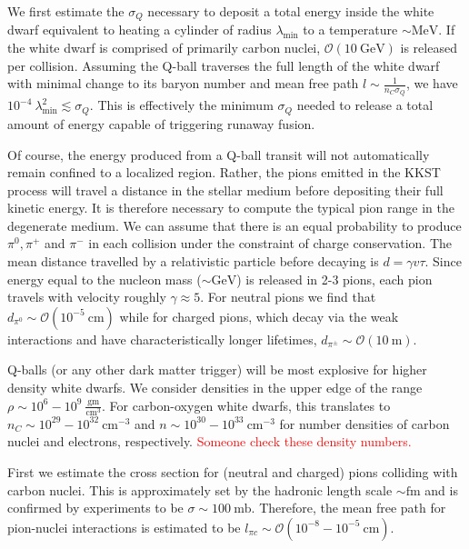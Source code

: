 \documentclass[11 pt, preprint,preprintnumbers,amsmath,amssymb, prd]{revtex4}
\begin{document}
We first estimate the $\sigma_Q$ necessary to deposit a total energy inside the white dwarf equivalent to heating a cylinder of radius $\lambda_{\text{min}}$ to a temperature $\sim \text{MeV}$. If the white dwarf is comprised of primarily carbon nuclei, $\mathcal{O}(10 ~\text{GeV})$ is released per collision. Assuming the Q-ball traverses the full length of the white dwarf with minimal change to its baryon number and mean free path $l \sim \frac{1}{n_C \sigma_Q}$, we have $10^{-4} ~\lambda_{\text{min}}^2 \lesssim \sigma_Q$. This is effectively the minimum $\sigma_Q$ needed to release a total amount of energy capable of triggering runaway fusion. 

Of course, the energy produced from a Q-ball transit will not automatically remain confined to a localized region. Rather, the pions emitted in the KKST process will travel a distance in the stellar medium before depositing their full kinetic energy. It is therefore necessary to compute the typical pion range in the degenerate medium. We can assume that there is an equal probability to produce $\pi^0, \pi^+$ and $\pi^-$ in each collision under the constraint of charge conservation. The mean distance travelled by a relativistic particle before decaying is $d = \gamma v \tau$. Since energy equal to the nucleon mass ($\sim \text{GeV}$) is released in 2-3 pions, each pion travels with velocity roughly $\gamma \approx 5$. For neutral pions we find that $d_{\pi^0} \sim \mathcal{O}(10^{-5} ~\text{cm})$ while for charged pions, which decay via the weak interactions and have characteristically longer lifetimes, $d_{\pi^\pm} \sim \mathcal{O}(10 ~\text{m})$. 

Q-balls (or any other dark matter trigger) will be most explosive for higher density white dwarfs. We consider densities in the upper edge of the range $\rho \sim 10^{6} - 10^{9} ~\frac{\text{gm}}{\text{cm}^3}$. For carbon-oxygen white dwarfs, this translates to $n_C \sim 10^{29} - 10^{32} ~\text{cm}^{-3}$ and $n \sim 10^{30} - 10^{33} ~\text{cm}^{-3}$ for number densities of carbon nuclei and electrons, respectively. \textcolor{red}{Someone check these density numbers.}

First we estimate the cross section for (neutral and charged) pions colliding with carbon nuclei. This is approximately set by the hadronic length scale $\sim \text{fm}$ and is confirmed by experiments to be $\sigma \sim 100 ~\text{mb} $. Therefore, the mean free path for pion-nuclei interactions is estimated to be $l_{\pi c} \sim \mathcal{O}(10^{-8} - 10^{-5} ~\text{cm})$. 
\end{document}
